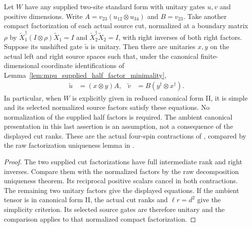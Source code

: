 \begin{lemma}
    \label{lem:mpu_supplied_four_spin_source_comparison}
    \leanok
    Let $W$ have any supplied two-site standard form with unitary gates
    $u,v$ and positive dimensions. Write
    $A=v_{23}(u_{12}\otimes u_{34})$ and $B=v_{23}$.
    Take another compact factorization of each actual source cut, normalized
    at a boundary matrix $\rho$ by
    $\widetilde X_1^\dagger(I\otimes\rho)\widetilde X_1=I$ and
    $\widetilde X_2^\dagger\widetilde X_2=I$, with right inverses of both
    right factors. Suppose its unshifted gate $\widetilde u$ is unitary.
    Then there are unitaries $x,y$ on the actual left and right source
    spaces such that, under the canonical finite-dimensional coordinate
    identifications of Lemma~\ref{lem:mpu_supplied_half_factor_minimality},
    \begin{align}
        \widetilde u & =(x\otimes y)A,                 &
        \widetilde v & =B(y^\dagger\otimes x^\dagger).
    \end{align}
    In particular, when $W$ is explicitly given in reduced canonical
    form II, it is simple and its selected normalized source factors
    satisfy these equations. No normalization of the supplied half factors
    is required. The ambient canonical presentation in this last assertion
    is an assumption, not a consequence of the displayed cut ranks.
    These are the actual four-spin contractions of
    \cite[lines~1237--1252]{Cirac2017MPU}, compared by the raw factorization
    uniqueness lemma in \cite{FrancoRubio2025MPUGauging}.
\end{lemma}

\begin{proof}\leanok
    The two supplied cut factorizations have full intermediate rank and
    right inverses. Compare them with the normalized factors by the raw
    decomposition uniqueness theorem. Its reciprocal positive scalars
    cancel in both contractions. The remaining two unitary factors give
    the displayed equations. If the ambient tensor is in canonical form II,
    the actual cut ranks and $\ell r=d^2$ give the simplicity criterion.
    Its selected source gates are therefore unitary and the comparison
    applies to that normalized compact factorization.
\end{proof}

